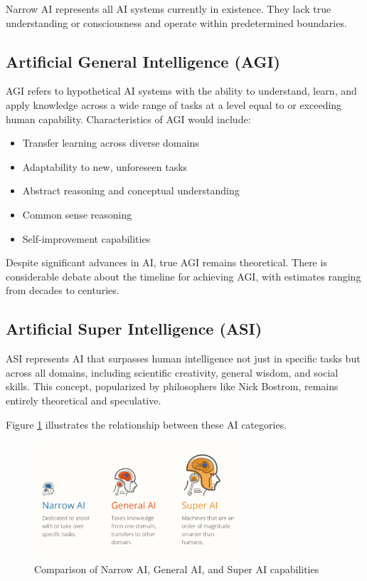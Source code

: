 \documentclass[11pt,a4paper]{report}
\begin{document}
Narrow AI represents all AI systems currently in existence. They lack true understanding or consciousness and operate within predetermined boundaries.

\subsection{Artificial General Intelligence (AGI)}
AGI refers to hypothetical AI systems with the ability to understand, learn, and apply knowledge across a wide range of tasks at a level equal to or exceeding human capability. Characteristics of AGI would include:

\begin{itemize}
    \item Transfer learning across diverse domains
    \item Adaptability to new, unforeseen tasks
    \item Abstract reasoning and conceptual understanding
    \item Common sense reasoning
    \item Self-improvement capabilities
\end{itemize}

Despite significant advances in AI, true AGI remains theoretical. There is considerable debate about the timeline for achieving AGI, with estimates ranging from decades to centuries.

\subsection{Artificial Super Intelligence (ASI)}
ASI represents AI that surpasses human intelligence not just in specific tasks but across all domains, including scientific creativity, general wisdom, and social skills. This concept, popularized by philosophers like Nick Bostrom, remains entirely theoretical and speculative.

Figure \ref{fig:ai-types} illustrates the relationship between these AI categories.

\begin{figure}[ht]
    \centering
    \includegraphics[width=0.7\textwidth]{ai_types_comparison.png}
    \caption{Comparison of Narrow AI, General AI, and Super AI capabilities}
    \label{fig:ai-types}
\end{figure}
\end{document}
